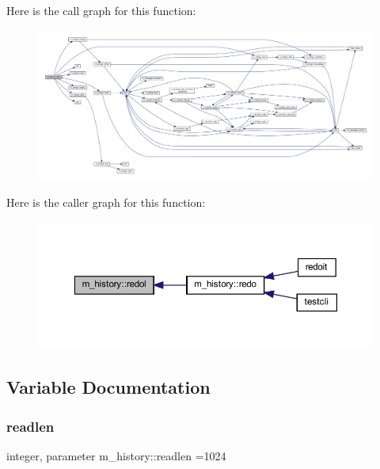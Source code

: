 Here is the call graph for this function\+:
\nopagebreak
\begin{figure}[H]
\begin{center}
\leavevmode
\includegraphics[width=350pt]{namespacem__history_a155404b1f975ae6fe778f836c043eeb2_cgraph}
\end{center}
\end{figure}
Here is the caller graph for this function\+:
\nopagebreak
\begin{figure}[H]
\begin{center}
\leavevmode
\includegraphics[width=350pt]{namespacem__history_a155404b1f975ae6fe778f836c043eeb2_icgraph}
\end{center}
\end{figure}


\subsection{Variable Documentation}
\mbox{\label{namespacem__history_aca543c267d8b80d0690c33e4a684143b}} 
\subsubsection{\texorpdfstring{readlen}{readlen}}
{\footnotesize\ttfamily integer, parameter m\+\_\+history\+::readlen =1024\hspace{0.3cm}{\ttfamily [private]}}

